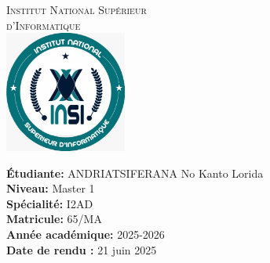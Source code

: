 \documentclass[12pt,a4paper]{article}
\begin{document}
	\begin{titlepage}
		\centering
		
		\textsc{\LARGE Institut National Supérieur\\[0.5cm] d'Informatique}\\[1.5cm]
		
		\includegraphics[width=0.3\textwidth]{logo.jpg}\\[1cm]
		
		\vfill
		\begin{center}
		\end{center}
		\vfill
		
		\begin{flushleft}
			\large
			\begin{center}
				\textbf{Étudiante:} ANDRIATSIFERANA No Kanto Lorida\\
			\textbf{Niveau:} Master 1 \\
			\textbf{Spécialité:} I2AD\\
            \textbf{Matricule:} 65/MA \\
			\textbf{Année académique:} 2025-2026\\
			\textbf{Date de rendu :} 21 juin 2025
			\end{center}
			
		\end{flushleft}
	
	\end{titlepage}
	
\end{document}

